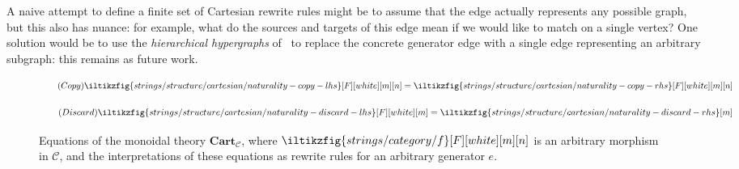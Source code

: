 \begin{remark}
    A naive attempt to define a finite set of Cartesian rewrite rules might be
    to assume that the edge actually represents any possible graph, but this
    also has nuance: for example, what do the sources and targets of this edge
    mean if we would like to match on a single vertex?
    One solution would be to use the \emph{hierarchical hypergraphs}
    of~\cite{alvarez-picallo2022rewriting} to replace the concrete generator
    edge with a single edge representing an arbitrary subgraph: this remains
    as future work.
\end{remark}


\begin{figure}
    \centering
    \begin{minipage}{0.45\textwidth}
        \begin{equation}
            \tag{\(\mathsf{Copy}\)}
            \iltikzfig{strings/structure/cartesian/naturality-copy-lhs}[F][white][m][n]
            =
            \iltikzfig{strings/structure/cartesian/naturality-copy-rhs}[F][white][m][n]
            \label{eq:cartesian-copy}
        \end{equation}
    \end{minipage}
    \qquad
    \begin{minipage}{0.4\textwidth}
        \centering
        \begin{equation}
            \tag{\(\mathsf{Discard}\)}
            \iltikzfig{strings/structure/cartesian/naturality-discard-lhs}[F][white][m]
            =
            \iltikzfig{strings/structure/cartesian/naturality-discard-rhs}[m]
            \label{eq:cartesian-discard}
        \end{equation}
    \end{minipage}

    \begin{minipage}{0.45\textwidth}
        \begin{center}
            
        \end{center}
    \end{minipage}
    \begin{minipage}{0.4\textwidth}
        \begin{center}
            
        \end{center}
    \end{minipage}

    \caption{
        Equations of the monoidal theory \(\mathbf{Cart}_\mathcal{C}\),
        where \(\iltikzfig{strings/category/f}[F][white][m][n]\) is an arbitrary
        morphism in \(\mathcal{C}\), and the interpretations of these equations
        as rewrite rules for an arbitrary generator \(e\).
    }
    \label{fig:cartesian-equations}
\end{figure}